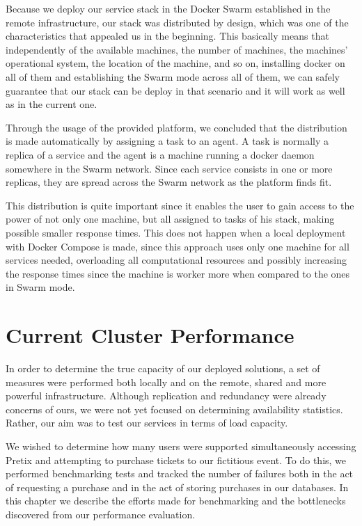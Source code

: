 \documentclass[12pt]{article}
\begin{document}
Because we deploy our service stack in the Docker Swarm established in the remote infrastructure, our stack was distributed by design, which was one of the 
characteristics that appealed us in the beginning. 
This basically means that independently of the available machines, the number of machines, the machines' operational system, the location of the machine, and so on, installing docker on all of them and establishing the Swarm mode across all of them, we can safely guarantee that our stack can be deploy in that scenario and it will work as well as in the current one.

Through the usage of the provided platform, we concluded that the distribution is made automatically by assigning a task to an agent. A task is normally a replica of a service and the agent is a machine running a docker daemon somewhere in the Swarm network. Since each service consists in one or more replicas, they are spread across the Swarm network as the platform finds fit.

This distribution is quite important since it enables the user to gain access to the power of not only one machine, but all assigned to tasks of his stack, making possible smaller response times. This does not happen when a local deployment with Docker Compose is made, since this approach uses only one machine for all services needed, overloading all computational resources and possibly increasing the response times since the machine is worker more when compared to the ones in Swarm mode.

\newpage
\section{Current Cluster Performance} \label{performance} %


In order to determine the true capacity of our deployed solutions, a set of measures were performed both locally and on the remote, shared and more powerful 
infrastructure.
Although replication and redundancy were already concerns of ours, we were not yet focused on determining availability statistics.
Rather, our aim was to test our services in terms of load capacity.

We wished to determine how many users were supported simultaneously accessing Pretix and attempting to purchase tickets to our fictitious event.
To do this, we performed benchmarking tests and tracked the number of failures both in the act of requesting a purchase and in the act of storing purchases in 
our databases.
In this chapter we describe the efforts made for benchmarking and the bottlenecks discovered from our performance evaluation.
\end{document}
